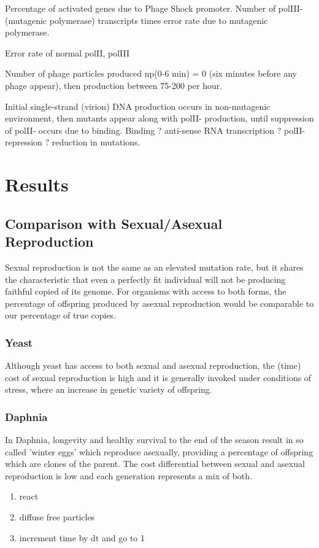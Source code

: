 \documentclass[10pt,letterpaper]{article}
\begin{document}
Percentage of activated genes due to Phage Shock promoter.
Number of polIII-  (mutagenic polymerase) transcripts times error rate due to mutagenic polymerase.

Error rate of normal polII, polIII

Number of phage particles produced np(0-6 min) = 0 (six minutes before any phage appear),
then production between 75-200 per hour.

Initial single-strand (virion) DNA production occurs in non-mutagenic environment, then mutants appear along with polII- production, until suppression of polII- occurs due to binding.  Binding ? anti-sense RNA transcription ? polII-  repression ? reduction in mutations.

\section*{Results}

\subsection*{Comparison with Sexual/Asexual Reproduction}
Sexual reproduction is not the same as an elevated mutation rate, but it shares the characteristic that even a perfectly fit individual will not be producing faithful copied of its genome. For organisms with access to both forms, the percentage of offspring produced by asexual reproduction would be comparable to our percentage of true copies.
\subsubsection*{Yeast}
Although yeast has access to both sexual and asexual reproduction, the (time) cost of sexual reproduction is high and it is generally invoked under conditions of stress, where an increase in genetic variety of offspring.
\subsubsection*{Daphnia} 
In Daphnia, longevity and healthy survival to the end of the season result in so called 'winter eggs' which reproduce asexually, providing a percentage of offspring which are clones of the parent. The cost differential between sexual and asexual reproduction is low and each generation represents a mix of both.

\begin{enumerate}
	\item{react}
	\item{diffuse free particles}
	\item{increment time by dt and go to 1}
\end{enumerate}
\end{document}

